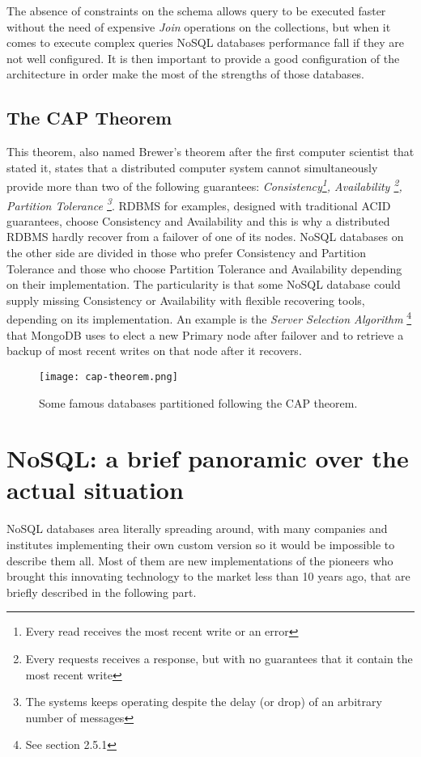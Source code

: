 The absence of constraints on the schema allows query to be executed faster without the need of expensive \textit{Join} operations on the collections, but when it comes to execute complex queries NoSQL databases performance fall if they are not well configured.
It is then important to provide a good configuration of the architecture in order make the most of the strengths of those databases.




\subsection{The CAP Theorem}
This theorem, also named Brewer's theorem after the first computer scientist that stated it, states that a distributed computer system cannot simultaneously provide more than two of the following guarantees: \textit{Consistency\footnote {Every read receives the most recent write or an error}, Availability \footnote{Every requests receives a response, but with no guarantees that it contain the most recent write}, Partition Tolerance \footnote{The systems keeps operating despite the delay (or drop) of an arbitrary number of messages }}.
RDBMS for examples, designed with traditional ACID guarantees, choose Consistency and Availability and this is why a distributed RDBMS hardly recover from a failover of one of its nodes.
NoSQL databases on the other side are divided in those who prefer Consistency and Partition Tolerance and those who choose Partition Tolerance and Availability depending on their implementation. The particularity is that some NoSQL database could supply missing Consistency or Availability with flexible recovering tools, depending on its implementation. An example is the \textit{ Server Selection Algorithm} \footnote{See section 2.5.1} that MongoDB uses to elect a new Primary node after failover and to retrieve a backup of most recent writes on that node after it recovers.
\begin{figure}[H]
\texttt{[image: cap-theorem.png]}
\centering
\caption{Some famous databases partitioned following the CAP theorem.} 
\end{figure}



\section {NoSQL: a brief panoramic over the actual situation}
NoSQL databases area literally spreading around, with many companies and institutes implementing their own custom version so it would be impossible to describe them all. 
Most of them are new implementations of the pioneers who brought this innovating technology to the market less than 10 years ago, that are briefly described in the following part.

